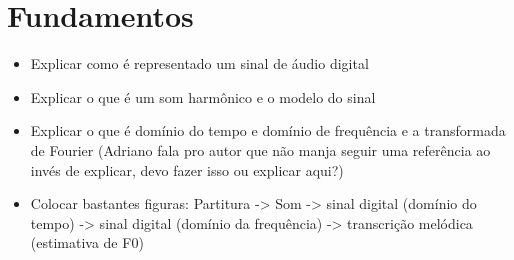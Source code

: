 \chapter{Fundamentos}
\label{cap:fundamentos}

\begin{itemize}
\item Explicar como é representado um sinal de áudio digital
\item Explicar o que é um som harmônico e o modelo do sinal
\item Explicar o que é domínio do tempo e domínio de frequência e a transformada de Fourier (Adriano fala pro autor que não manja seguir uma referência ao invés de explicar, devo fazer isso ou explicar aqui?)
\item Colocar bastantes figuras: Partitura -> Som -> sinal digital (domínio do tempo) -> sinal digital (domínio da frequência) -> transcrição melódica (estimativa de F0)
\end{itemize}



